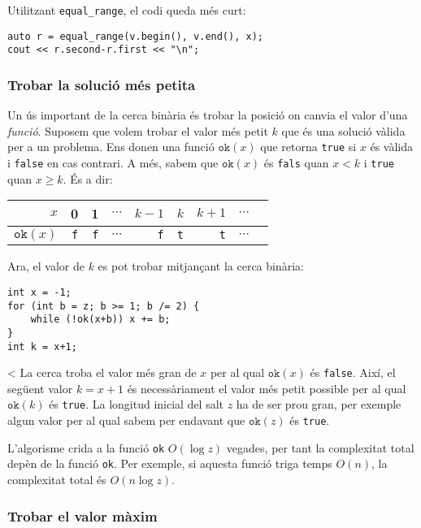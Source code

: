 Utilitzant \texttt{equal\_range}, el codi queda més curt:

\begin{lstlisting}
auto r = equal_range(v.begin(), v.end(), x);
cout << r.second-r.first << "\n";
\end{lstlisting}

\subsubsection{Trobar la solució més petita}

Un ús important de la cerca binària és
trobar la posició on canvia el valor d'una \emph{funció}.
Suposem que volem trobar el valor més petit $k$
que és una solució vàlida per a un problema.
Ens donen una funció $\texttt{ok}(x)$
que retorna \texttt{true} si $x$ és vàlida
i \texttt{false} en cas contrari.
A més, sabem que $\texttt{ok}(x)$ és \texttt{fals}
quan $x<k$ i \texttt{true} quan $x \ge k$.
És a dir:

\begin{centre}
\begin{tabular}{r|rrrrrrrr}
$x$ & 0 & 1 & $\cdots$ & $k-1$ & $k$ & $k+1$ & $\cdots$ \\
\hline
$\texttt{ok}(x)$ & \texttt{f} & \texttt{f}
& $\cdots$ & \texttt{f} & \texttt{t} & \texttt{t} & $\cdots$ \\
\end{tabular}
\end{centre}

\noindent
Ara, el valor de $k$ es pot trobar mitjançant la cerca binària:

\begin{lstlisting}
int x = -1;
for (int b = z; b >= 1; b /= 2) {
    while (!ok(x+b)) x += b;
}
int k = x+1;
\end{lstlisting}
<
La cerca troba el valor més gran de $x$ per al qual
$\texttt{ok}(x)$ és \texttt{false}.
Així, el següent valor $k=x+1$
és necessàriament el valor més petit possible per al qual
$\texttt{ok}(k)$ és \texttt{true}.
La longitud inicial del salt $z$ ha de ser
prou gran, per exemple algun valor
per al qual sabem per endavant que $\texttt{ok}(z)$ és \texttt{true}.

L'algorisme crida a la funció \texttt{ok}
$O(\log z)$ vegades, per tant la complexitat total
depèn de la funció \texttt{ok}.
Per exemple, si aquesta funció triga temps $O(n)$,
la complexitat total és $O(n \log z)$.

\subsubsection{Trobar el valor màxim}

